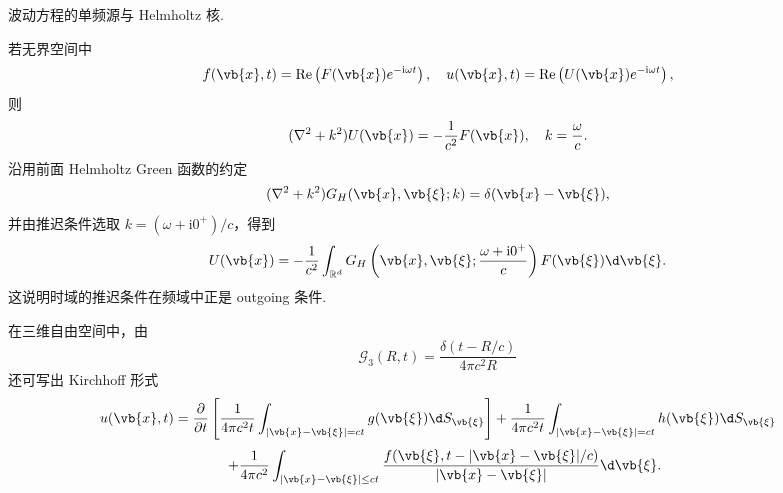 \begin{example}
	波动方程的单频源与 Helmholtz 核.
	
	若无界空间中
	\begin{equation*}
		f(\vb{x},t)=\operatorname{Re}\left(F(\vb{x})e^{-\mathrm{i}\omega t}\right),
		\quad
		u(\vb{x},t)=\operatorname{Re}\left(U(\vb{x})e^{-\mathrm{i}\omega t}\right),
	\end{equation*}
	则
	\begin{equation*}
		(\nabla^2+k^2)U(\vb{x})=-\frac{1}{c^2}F(\vb{x}),
		\quad k=\frac{\omega}{c}.
	\end{equation*}
	沿用前面 Helmholtz Green 函数的约定
	\begin{equation*}
		(\nabla^2+k^2)G_H(\vb{x},\vb{\xi};k)=\delta(\vb{x}-\vb{\xi}),
	\end{equation*}
	并由推迟条件选取 \(k=(\omega+\mathrm{i}0^+)/c\)，得到
	\begin{equation*}
		U(\vb{x})=-\frac{1}{c^2}\int_{\mathbb{R}^d}
		G_H\left(\vb{x},\vb{\xi};\frac{\omega+\mathrm{i}0^+}{c}\right)
		F(\vb{\xi})\d\vb{\xi}.
	\end{equation*}
	这说明时域的推迟条件在频域中正是 outgoing 条件.
\end{example}

在三维自由空间中，由
\begin{equation*}
	\mathcal{G}_3(R,t)=\frac{\delta(t-R/c)}{4\pi c^2R}
\end{equation*}
还可写出 Kirchhoff 形式
\begin{equation*}
	u(\vb{x},t)=\frac{\partial}{\partial t}\left[
	\frac{1}{4\pi c^2t}\int_{|\vb{x}-\vb{\xi}|=ct}g(\vb{\xi})\d S_{\vb{\xi}}
	\right]
	+\frac{1}{4\pi c^2t}\int_{|\vb{x}-\vb{\xi}|=ct}h(\vb{\xi})\d S_{\vb{\xi}}
\end{equation*}
\begin{equation*}
	\quad+\frac{1}{4\pi c^2}\int_{|\vb{x}-\vb{\xi}|\leq ct}
	\frac{f(\vb{\xi},t-|\vb{x}-\vb{\xi}|/c)}{|\vb{x}-\vb{\xi}|}\d\vb{\xi}.
\end{equation*}

